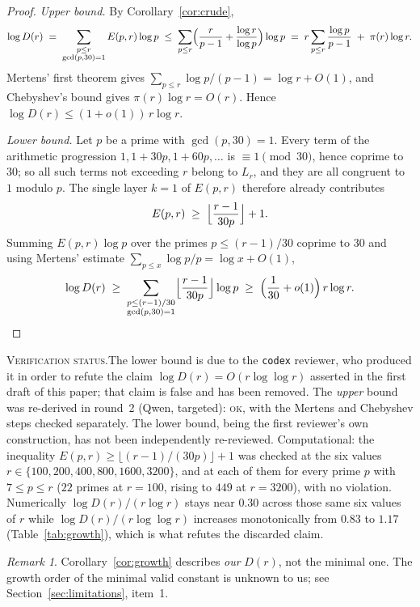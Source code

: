 \documentclass[11pt]{article}
\theoremstyle{plain}
\theoremstyle{definition}
\theoremstyle{remark}
\newtheorem*{remark}{Remark}
\numberwithin{equation}{section}
\newcommand{\Lr}{L_r}
\newcommand{\vstatus}[1]{%
  \par\vspace{3pt}\noindent
  {\small\textsc{Verification status.}\enspace #1}\par\vspace{3pt}}
\begin{document}
\begin{proof}
\emph{Upper bound.} By Corollary~\ref{cor:crude},
\[
  \log D(r) \;=\; \sum_{\substack{p \le r\\ \gcd(p,30)=1}} E(p,r)\log p
  \;\le\; \sum_{p \le r}\Bigl(\frac{r}{p-1} + \frac{\log r}{\log p}\Bigr)\log p
  \;=\; r\sum_{p\le r}\frac{\log p}{p-1} \;+\; \pi(r)\log r .
\]
Mertens' first theorem gives $\sum_{p \le r}\log p/(p-1) = \log r + O(1)$, and Chebyshev's bound
gives $\pi(r)\log r = O(r)$. Hence $\log D(r) \le (1+o(1))\,r\log r$.

\emph{Lower bound.} Let $p$ be a prime with $\gcd(p,30)=1$. Every term of the arithmetic
progression $1, 1+30p, 1+60p, \dots$ is $\equiv 1 \pmod{30}$, hence coprime to $30$; so all such
terms not exceeding $r$ belong to $\Lr$, and they are all congruent to $1$ modulo $p$. The single
layer $k=1$ of $E(p,r)$ therefore already contributes
\[
  E(p,r) \;\ge\; \Bigl\lfloor \frac{r-1}{30p}\Bigr\rfloor + 1 .
\]
Summing $E(p,r)\log p$ over the primes $p \le (r-1)/30$ coprime to $30$ and using Mertens'
estimate $\sum_{p \le x}\log p / p = \log x + O(1)$,
\[
  \log D(r) \;\ge\; \sum_{\substack{p \le (r-1)/30\\ \gcd(p,30)=1}}
    \Bigl\lfloor\frac{r-1}{30p}\Bigr\rfloor \log p
  \;\ge\; \Bigl(\frac{1}{30}+o(1)\Bigr)\, r\log r . \qedhere
\]
\end{proof}
\vstatus{The lower bound is due to the \texttt{codex} reviewer, who produced it in order to refute
the claim $\log D(r) = O(r\log\log r)$ asserted in the first draft of this paper; that claim is
false and has been removed. The \emph{upper} bound was re-derived in round~2 (Qwen, targeted):
\textsc{ok}, with the Mertens and Chebyshev steps checked separately. The lower bound, being the
first reviewer's own construction, has not been independently re-reviewed.
Computational: the inequality $E(p,r) \ge \lfloor (r-1)/(30p)\rfloor + 1$ was
checked at the six values $r \in \{100, 200, 400, 800, 1600, 3200\}$, and at each of them for
every prime $p$ with $7 \le p \le r$ ($22$ primes at $r=100$, rising to $449$ at $r=3200$), with
no violation. Numerically
$\log D(r)/(r\log r)$ stays near $0.30$ across those same six values of $r$ while
$\log D(r)/(r\log\log r)$ increases monotonically from $0.83$ to $1.17$
(Table~\ref{tab:growth}), which is what refutes the discarded claim.}

\begin{remark}
Corollary~\ref{cor:growth} describes \emph{our} $D(r)$, not the minimal one. The growth order of
the minimal valid constant is unknown to us; see Section~\ref{sec:limitations}, item~1.
\end{remark}
\end{document}

